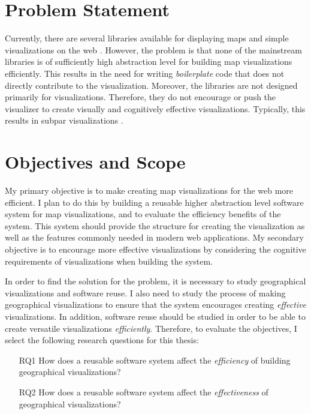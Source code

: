 \section{Problem Statement}

Currently, there are several libraries available for displaying maps and simple visualizations on the web \citep{google_maps_2005,agafonkin_leaflet_2011,metacarta_openlayers_2006}. However, the problem is that none of the mainstream libraries is of sufficiently high abstraction level for building map visualizations efficiently. This results in the need for writing \emph{boilerplate} code that does not directly contribute to the visualization. Moreover, the libraries are not designed primarily for visualizations. Therefore, they do not encourage or push the visualizer to create visually and cognitively effective visualizations. Typically, this results in subpar visualizations \citep[chap.~1]{slocum_thematic_2014}.

\section{Objectives and Scope}

My primary objective is to make creating map visualizations for the web more efficient. I plan to do this by building a reusable higher abstraction level software system for map visualizations, and to evaluate the efficiency benefits of the system. This system should provide the structure for creating the visualization as well as the features commonly needed in modern web applications. My secondary objective is to encourage more effective visualizations by considering the cognitive requirements of visualizations when building the system.

In order to find the solution for the problem, it is necessary to study geographical visualizations and software reuse. I also need to study the process of making geographical visualizations to ensure that the system encourages creating \emph{effective} visualizations. In addition, software reuse should be studied in order to be able to create versatile visualizations \emph{efficiently}. Therefore, to evaluate the objectives, I select the following research questions for this thesis:

\begin{enumerate}
	\item[RQ1] How does a reusable software system affect the \emph{efficiency} of building geographical visualizations?
	\item[RQ2] How does a reusable software system affect the \emph{effectiveness} of geographical visualizations?
\end{enumerate}

